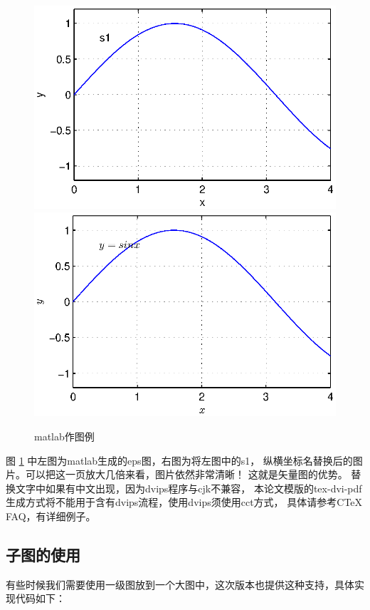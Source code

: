 \begin{figure}
\centering
\includegraphics[scale=0.6]{./Pictures/matlabfig.eps}
\includegraphics[scale=0.6]{./Pictures/matlabfigchg.eps}
\caption{matlab作图例}
\label{Figmatlab}
\end{figure}

图 \ref{Figmatlab} 中左图为matlab生成的eps图，右图为将左图中的s1，
纵横坐标名替换后的图片。可以把这一页放大几倍来看，图片依然非常清晰！
这就是矢量图的优势。
替换文字中如果有中文出现，因为dvips程序与cjk不兼容，
本论文模版的tex-dvi-pdf生成方式将不能用于含有dvips流程，使用dvips须使用cct方式，
具体请参考CTeX FAQ，有详细例子。

\subsection{子图的使用}
有些时候我们需要使用一级图放到一个大图中，这次版本也提供这种支持，具体实现代码如下：

